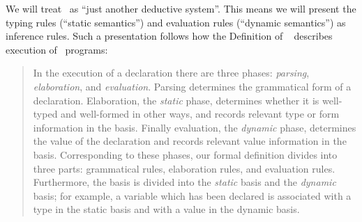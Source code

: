 \begin{node}\label{sml-0002}%
We will treat \SML\ as ``just another deductive system''. This means we
will present the typing rules (``static semantics'') and evaluation
rules (``dynamic semantics'') as inference rules. Such a presentation
follows how the Definition of \SML~\cite[\S1]{milner1997definition}
describes execution of \SML\ programs:
\begin{quote}
In the execution of a declaration there are three phases:
\emph{parsing}, \emph{elaboration}, and \emph{evaluation}. Parsing
determines the grammatical form of a declaration. Elaboration, the
\emph{static} phase, determines whether it is well-typed and well-formed
in other ways, and records relevant type or form information in the
basis. Finally evaluation, the \emph{dynamic} phase, determines the
value of the declaration and records relevant value information in the
basis. Corresponding to these phases, our formal definition divides into
three parts: grammatical rules, elaboration rules, and evaluation
rules. Furthermore, the basis is divided into the \emph{static} basis
and the \emph{dynamic} basis; for example, a variable which has been
declared is associated with a type in the static basis and with a value
in the dynamic basis.
\end{quote}
\end{node}
